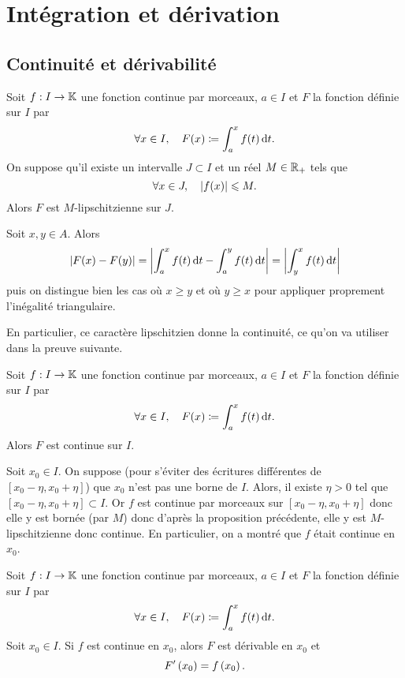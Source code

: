 \documentclass{magnolia}
\begin{document}
\section{Intégration et dérivation}
\subsection{Continuité et dérivabilité}
\begin{proposition}[utile=-3]
Soit $f:I\to\mathbb{K}$ une fonction continue par morceaux, $a\in I$ et
$F$ la fonction définie sur $I$ par
\[\forall x\in I ,\quad F(x)\coloneqq\int_{a}^{x} f(t)\,\text{d}t.\]
On suppose qu'il existe un intervalle $J\subset I$ et un réel $M\in\mathbb{R}_+$ tels
que
\[\forall x\in J ,\quad \left|f(x)\right|\leqslant M.\]
Alors $F$ est $M$-lipschitzienne sur $J$.
\end{proposition}

\begin{preuve}
Soit $x,y\in A$. Alors $$|F(x)-F(y)|=\left|\int_{a}^{x} f(t)\,\text{d}t-\int_{a}^{y} f(t)\,\text{d}t\right|=\left|\int_{y}^{x} f(t)\,\text{d}t\right|$$ puis on distingue bien les cas où $x\geq y$ et où $y\geq x$ pour appliquer proprement l'inégalité triangulaire.

En particulier, ce caractère lipschitzien donne la continuité, ce qu'on va utiliser dans la preuve suivante.
\end{preuve}

\begin{proposition}[utile=-3]
Soit $f:I\to\mathbb{K}$ une fonction continue par morceaux, $a\in I$ et $F$ la fonction
définie sur $I$ par
\[\forall x\in I ,\quad F(x)\coloneqq\int_{a}^{x} f(t)\,\text{d}t.\]
Alors $F$ est continue sur $I$.
\end{proposition}

\begin{preuve}
Soit $x_0\in I$. On suppose (pour s'éviter des écritures différentes de $[x_0-\eta,x_0+\eta]$) que $x_0$ n'est pas une borne de $I$. Alors, il existe $\eta>0$ tel que $[x_0-\eta,x_0+\eta]\subset I$. Or $f$ est continue par morceaux sur $[x_0-\eta,x_0+\eta]$ donc elle y est bornée (par $M$) donc d'après la proposition précédente, elle y est $M$-lipschitzienne donc continue. En particulier, on a montré que $f$ était continue en $x_0$.

\end{preuve}


\begin{proposition}[utile=-3]
Soit $f:I\to\mathbb{K}$ une fonction continue par morceaux, $a\in I$ et $F$ la fonction définie sur $I$ par
\[\forall x\in I ,\quad F(x)\coloneqq\int_{a}^{x} f(t)\,\text{d}t.\]
Soit $x_0\in I$. Si $f$ est continue en $x_0$, alors $F$ est dérivable en $x_0$
et
\[F'\left(x_0\right)=f\left(x_0\right).\]
\end{proposition}
\end{document}
